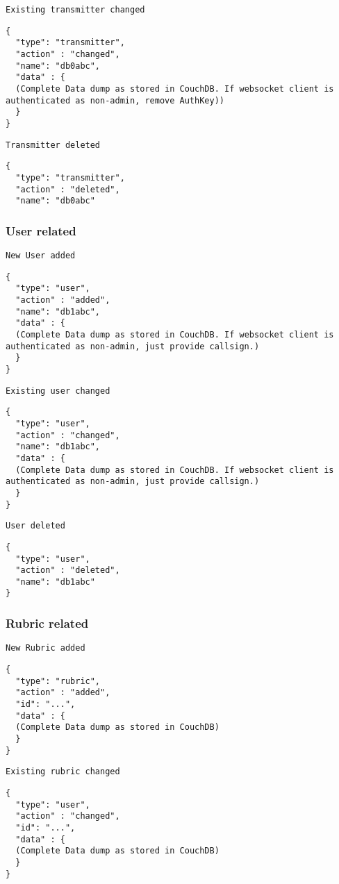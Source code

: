 \texttt{Existing transmitter changed}
\begin{lstlisting}
{
  "type": "transmitter",
  "action" : "changed",
  "name": "db0abc",
  "data" : {
  (Complete Data dump as stored in CouchDB. If websocket client is authenticated as non-admin, remove AuthKey))
  }
}
\end{lstlisting}

\texttt{Transmitter deleted}
\begin{lstlisting}
{
  "type": "transmitter",
  "action" : "deleted",
  "name": "db0abc"
\end{lstlisting}

\subsubsection{User related}
\texttt{New User added}
\begin{lstlisting}
{
  "type": "user",
  "action" : "added",
  "name": "db1abc",
  "data" : {
  (Complete Data dump as stored in CouchDB. If websocket client is authenticated as non-admin, just provide callsign.)
  }
}
\end{lstlisting}

\texttt{Existing user changed}
\begin{lstlisting}
{
  "type": "user",
  "action" : "changed",
  "name": "db1abc",
  "data" : {
  (Complete Data dump as stored in CouchDB. If websocket client is authenticated as non-admin, just provide callsign.)
  }
}
\end{lstlisting}

\texttt{User deleted}
\begin{lstlisting}
{
  "type": "user",
  "action" : "deleted",
  "name": "db1abc"
}
\end{lstlisting}


\subsubsection{Rubric related}
\texttt{New Rubric added}
\begin{lstlisting}
{
  "type": "rubric",
  "action" : "added",
  "id": "...",
  "data" : {
  (Complete Data dump as stored in CouchDB)
  }
}
\end{lstlisting}

\texttt{Existing rubric changed}
\begin{lstlisting}
{
  "type": "user",
  "action" : "changed",
  "id": "...",
  "data" : {
  (Complete Data dump as stored in CouchDB)
  }
}
\end{lstlisting}

